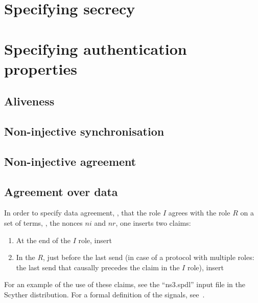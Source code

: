 \documentclass{book}
\begin{document}

\section{Specifying secrecy}



\section{Specifying authentication properties}

\subsection{Aliveness}

\subsection{Non-injective synchronisation}

\subsection{Non-injective agreement}

\subsection{Agreement over data}
\label{sec:agreement}

	  In order to specify data agreement, \eg, that the role $I$ agrees with
	  the role $R$ on a set of terms, \eg, the nonces
	  $ni$ and $nr$, one inserts two claims:
	  \begin{enumerate}
		  \item At the end of the $I$ role, insert
		  \item In the $R$, just before the last send (in case
			  of a protocol with multiple roles: the last
			  send that
			  causally precedes the claim in the $I$ role),
			  insert

	  \end{enumerate}
  For an example of the use of these claims, see the ``ns3.spdl'' input file in the Scyther
  distribution. For a formal definition of the signals,
  see~\cite{lowe97hierarchy}.
\end{document}

